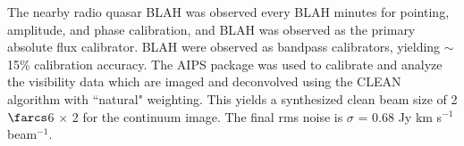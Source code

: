 \documentclass[]{emulateapj}
\begin{document}
The nearby radio quasar BLAH was observed every BLAH minutes for
pointing, amplitude, and phase calibration, and BLAH was observed as the
primary
absolute flux calibrator. BLAH were observed as bandpass calibrators, yielding
$\sim
$15\% calibration accuracy.
The AIPS package was used to calibrate and analyze the visibility data which
are imaged and deconvolved using
the CLEAN algorithm with ``natural" weighting. This yields a synthesized clean
beam size of 2$\farcs$6 $\times$ 2 for the continuum image. The final
rms 
noise is $\sigma$ = 0.68 Jy km s$^{-1}$ beam$^{-1}$.
\end{document}
